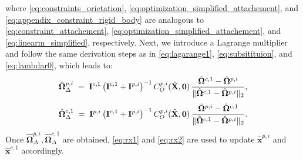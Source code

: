 where \eqref{eq:constraints_orietation}, 
\eqref{eq:optimization_simplified_attachement},
and \eqref{eq:appendix_constraint_rigid_body} are analogous to 
\eqref{eq:constraint_attachement}, 
\eqref{eq:optimization_simplified_attachement}, 
and \eqref{eq:linearm_simplified}, respectively.
Next, we introduce a Lagrange multiplier and follow the same derivation steps as in \eqref{eq:lagarange1}, \eqref{eq:subsitituion}, and \eqref{eq:lambdar0}, which leads to:
\begin{align}
    \hat{\boldsymbol{\Omega}}_\Delta^{p,i} 
    \;=\; 
    \mathbf{I}^{c, 1}\,\bigl(\mathbf{I}^{c, 1}+\mathbf{I}^{p,i}\bigr)^{-1}\,C^{p,i}_O(\hat{\mathbf{X}}, \mathbf{0})\,
    \frac{\hat{\boldsymbol{\Omega}}^{c, 1} - \hat{\boldsymbol{\Omega}}^{p, i}}{\|\hat{\boldsymbol{\Omega}}^{c, 1} - \hat{\boldsymbol{\Omega}}^{p, i}\|_2}, 
    \notag
\end{align}
\begin{align}
    \hat{\boldsymbol{\Omega}}_\Delta^{c,1} 
    \;=\; 
    \mathbf{I}^{p, i}\,\bigl(\mathbf{I}^{c,1}+\mathbf{I}^{p,i}\bigr)^{-1}\,C^{p,i}_O(\hat{\mathbf{X}}, \mathbf{0})\,
    \frac{\hat{\boldsymbol{\Omega}}^{p, i} - \hat{\boldsymbol{\Omega}}^{c, 1}}{\|\hat{\boldsymbol{\Omega}}^{c, 1} - \hat{\boldsymbol{\Omega}}^{p, i}\|_2}.
    \notag
\end{align}
Once $\hat{\boldsymbol{\Omega}}_\Delta^{p,i}, \hat{\boldsymbol{\Omega}}_\Delta^{c,1}$ are obtained, 
\eqref{eq:rx1} and \eqref{eq:rx2} are used to update 
\(\hat{\mathbf{x}}^{p,i}\) and \(\hat{\mathbf{x}}^{c,1}\) accordingly.


